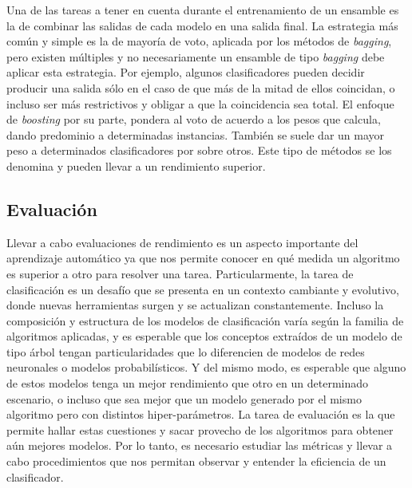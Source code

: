\begin{description}
\end{description}

Una de las tareas a tener en cuenta durante el entrenamiento de un ensamble es
la de combinar las salidas de cada modelo en una salida final. La estrategia más
común y simple es la de mayoría de voto, aplicada por los métodos de
\textit{bagging}, pero existen múltiples y no necesariamente un ensamble de tipo
\textit{bagging} debe aplicar esta estrategia. Por ejemplo, algunos
clasificadores pueden decidir producir una salida sólo en el caso de que más de
la mitad de ellos coincidan, o incluso ser más restrictivos y obligar a que la
coincidencia sea total. El enfoque de \textit{boosting} por su parte, pondera al
voto de acuerdo a los pesos que calcula, dando predominio a determinadas
instancias.  También se suele dar un mayor peso a determinados clasificadores
por sobre otros. Este tipo de métodos se los denomina  y pueden llevar a un rendimiento superior.



\subsection{Evaluación}
\label{evaluacion_intro}

Llevar a cabo evaluaciones de rendimiento es un aspecto importante del
aprendizaje automático ya que nos permite conocer en qué medida un algoritmo es
superior a otro para resolver una tarea. Particularmente, la tarea de
clasificación es un desafío que se presenta en un contexto cambiante y
evolutivo, donde nuevas herramientas surgen y se actualizan constantemente.
Incluso la composición y estructura de los modelos de clasificación varía según
la familia de algoritmos aplicadas, y es esperable que los conceptos extraídos
de un modelo de tipo árbol tengan particularidades que lo diferencien de modelos
de redes neuronales o modelos probabilísticos. Y del mismo modo, es esperable
que alguno de estos modelos tenga un mejor rendimiento que otro en un
determinado escenario, o incluso que sea mejor que un modelo generado por el
mismo algoritmo pero con distintos hiper-parámetros. La tarea de evaluación es la
que permite hallar estas cuestiones y sacar provecho de los algoritmos para
obtener aún mejores modelos. Por lo tanto, es necesario estudiar las métricas y
llevar a cabo procedimientos que nos permitan observar y entender la eficiencia
de un clasificador. 

